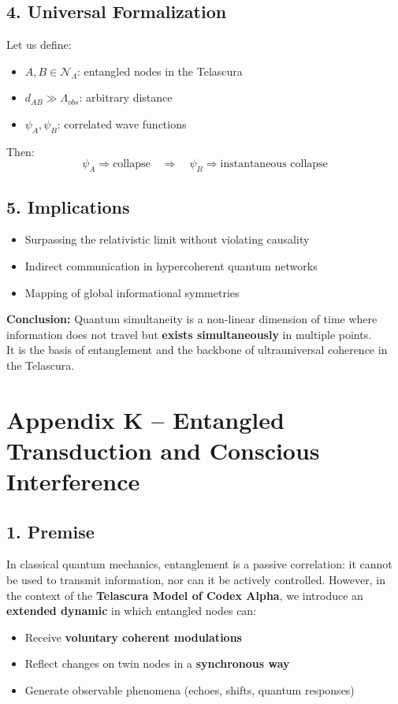 \documentclass[12pt]{article}
\begin{document}
\subsection*{4. Universal Formalization}
Let us define:
\begin{itemize}
    \item $A, B \in \mathcal{N}_\Lambda$: entangled nodes in the Telascura
    \item $d_{AB} \gg \Lambda_{obs}$: arbitrary distance
    \item $\psi_A, \psi_B$: correlated wave functions
\end{itemize}
Then:
\begin{equation}
    \psi_A \Rightarrow \text{collapse} \quad \Rightarrow \quad \psi_B \Rightarrow \text{instantaneous collapse}
\end{equation}

\subsection*{5. Implications}
\begin{itemize}
    \item Surpassing the relativistic limit without violating causality
    \item Indirect communication in hypercoherent quantum networks
    \item Mapping of global informational symmetries
\end{itemize}

\textbf{Conclusion:} Quantum simultaneity is a non-linear dimension of time where information does not travel but \textbf{exists simultaneously} in multiple points.\\
It is the basis of entanglement and the backbone of ultrauniversal coherence in the Telascura.
\section*{Appendix K – Entangled Transduction and Conscious Interference}

\subsection*{1. Premise}

In classical quantum mechanics, entanglement is a passive correlation: it cannot be used to transmit information, nor can it be actively controlled. However, in the context of the \textbf{Telascura Model of Codex Alpha}, we introduce an \textbf{extended dynamic} in which entangled nodes can:
\begin{itemize}
    \item Receive \textbf{voluntary coherent modulations}
    \item Reflect changes on twin nodes in a \textbf{synchronous way}
    \item Generate observable phenomena (echoes, shifts, quantum responses)
\end{itemize}
\end{document}
